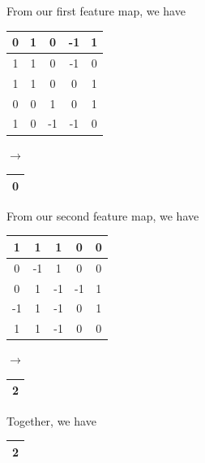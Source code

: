 \begin{tcolorbox}[title=Solution]
	From our first feature map, we have
	\begin{center}
		\begin{tabular}{|c|c|c|c|c|}
			\hline
			\cellcolor{gray} 0 & 1 & \cellcolor{gray}0  & -1 & \cellcolor{gray}1 \\ \hline
			1                  & 1 & 0                  & -1 & 0                 \\ \hline
			\cellcolor{gray} 1 & 1 & \cellcolor{gray}0  & 0  & \cellcolor{gray}1 \\ \hline
			0                  & 0 & 1                  & 0  & 1                 \\ \hline
			\cellcolor{gray}1  & 0 & \cellcolor{gray}-1 & -1 & \cellcolor{gray}0 \\ \hline
		\end{tabular}
		$\rightarrow$
		\begin{tabular}{|c|}
			\hline
			0 \\
			\hline
		\end{tabular}
	\end{center}
	From our second feature map, we have
	\begin{center}
		\begin{tabular}{|c|c|c|c|c|}
			\hline
			\cellcolor{gray}1 & 1  & \cellcolor{gray}1  & 0  & \cellcolor{gray}0 \\ \hline
			0                 & -1 & 1                  & 0  & 0                 \\ \hline
			\cellcolor{gray}0 & 1  & \cellcolor{gray}-1 & -1 & \cellcolor{gray}1 \\ \hline
			-1                & 1  & -1                 & 0  & 1                 \\ \hline
			\cellcolor{gray}1 & 1  & \cellcolor{gray}-1 & 0  & \cellcolor{gray}0 \\ \hline
		\end{tabular}
		$\rightarrow$
		\begin{tabular}{|c|}
			\hline
			2 \\
			\hline
		\end{tabular}
	\end{center}
	Together, we have
	\begin{center}
		\begin{tabular}{|c|}
			\hline
			2 \\
			\hline
		\end{tabular}
	\end{center}
\end{tcolorbox}
